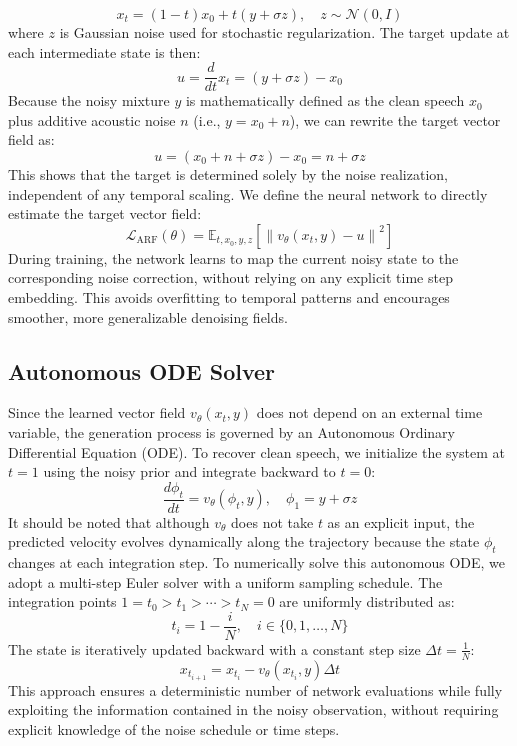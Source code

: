\documentclass[cameraready]{Interspeech}
\begin{document}
\begin{equation}
    x_t = (1 - t)x_0 + t(y + \sigma z), \quad z \sim \mathcal{N}(0, I)
\end{equation}
where $z$ is Gaussian noise used for stochastic regularization. The target update at each intermediate state is then:
\begin{equation}
    u = \frac{d}{dt}x_t = (y + \sigma z) - x_0
\end{equation}
Because the noisy mixture $y$ is mathematically defined as the clean speech $x_0$ plus additive acoustic noise $n$ (i.e., $y = x_0 + n$), we can rewrite the target vector field as:
\begin{equation}
    u = (x_0 + n + \sigma z) - x_0 = n + \sigma z
    \label{eq:u}
\end{equation}
This shows that the target is determined solely by the noise realization, independent of any temporal scaling. We define the neural network to directly estimate the target vector field:
\begin{equation}
    \mathcal{L}_{\text{ARF}}(\theta) = \mathbb{E}_{t, x_0, y, z} \left[ \left\lVert v_\theta(x_t, y) - u \right\rVert^2 \right]
\end{equation}
During training, the network learns to map the current noisy state to the corresponding noise correction, without relying on any explicit time step embedding. This avoids overfitting to temporal patterns and encourages smoother, more generalizable denoising fields.


\subsection{Autonomous ODE Solver}
Since the learned vector field $v_\theta(x_t, y)$ does not depend on an external time variable, the generation process is governed by an Autonomous Ordinary Differential Equation (ODE). To recover clean speech, we initialize the system at $t=1$ using the noisy prior and integrate backward to $t=0$:
\begin{equation}
    \frac{d\phi_{t}}{dt} = v_{\theta}(\phi_{t}, y), \quad \phi_1 = y + \sigma z
\end{equation}
It should be noted that although $v_\theta$ does not take $t$ as an explicit input, the predicted velocity evolves dynamically along the trajectory because the state $\phi_t$ changes at each integration step. To numerically solve this autonomous ODE, we adopt a multi-step Euler solver with a uniform sampling schedule. The integration points $1 = t_0 > t_1 > \cdots > t_N = 0$ are uniformly distributed as:
\begin{equation}
    t_i = 1 - \frac{i}{N}, \quad i \in \{0, 1, \dots, N\}
\end{equation}
The state is iteratively updated backward with a constant step size $\Delta t = \frac{1}{N}$:
\begin{equation}
    x_{t_{i+1}} = x_{t_i} - v_\theta(x_{t_i}, y) \Delta t
\end{equation}
This approach ensures a deterministic number of network evaluations while fully exploiting the information contained in the noisy observation, without requiring explicit knowledge of the noise schedule or time steps.
\end{document}
